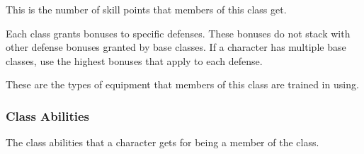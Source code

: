            This is the number of skill points that members of this class get.

            Each class grants bonuses to specific defenses.
            These bonuses do not stack with other defense bonuses granted by base classes.
            If a character has multiple base classes, use the highest bonuses that apply to each defense.

            These are the types of equipment that members of this class are trained in using.

        \subsubsection{Class Abilities}
            The class abilities that a character gets for being a member of the class.

